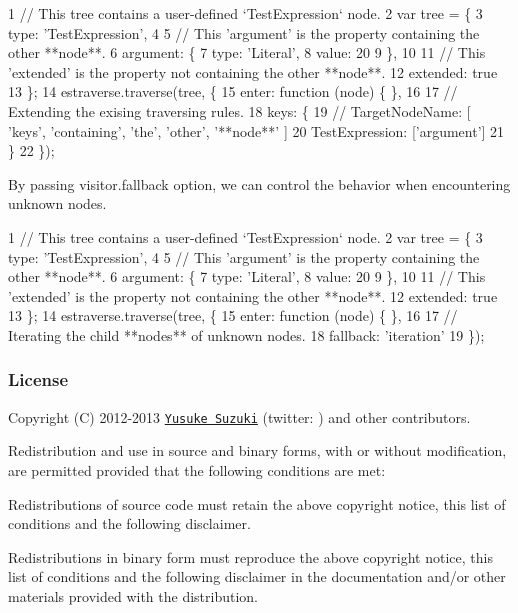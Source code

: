 \begin{DoxyCode}
1 // This tree contains a user-defined `TestExpression` node.
2 var tree = \{
3     type: 'TestExpression',
4 
5     // This 'argument' is the property containing the other **node**.
6     argument: \{
7         type: 'Literal',
8         value: 20
9     \},
10 
11     // This 'extended' is the property not containing the other **node**.
12     extended: true
13 \};
14 estraverse.traverse(tree, \{
15     enter: function (node) \{ \},
16 
17     // Extending the exising traversing rules.
18     keys: \{
19         // TargetNodeName: [ 'keys', 'containing', 'the', 'other', '**node**' ]
20         TestExpression: ['argument']
21     \}
22 \});
\end{DoxyCode}


By passing {\ttfamily visitor.\+fallback} option, we can control the behavior when encountering unknown nodes. 
\begin{DoxyCode}
1 // This tree contains a user-defined `TestExpression` node.
2 var tree = \{
3     type: 'TestExpression',
4 
5     // This 'argument' is the property containing the other **node**.
6     argument: \{
7         type: 'Literal',
8         value: 20
9     \},
10 
11     // This 'extended' is the property not containing the other **node**.
12     extended: true
13 \};
14 estraverse.traverse(tree, \{
15     enter: function (node) \{ \},
16 
17     // Iterating the child **nodes** of unknown nodes.
18     fallback: 'iteration'
19 \});
\end{DoxyCode}


\subsubsection*{License}

Copyright (C) 2012-\/2013 \href{http://github.com/Constellation}{\tt Yusuke Suzuki} (twitter\+: \href{http://twitter.com/Constellation}{\tt }) and other contributors.

Redistribution and use in source and binary forms, with or without modification, are permitted provided that the following conditions are met\+:


\begin{DoxyItemize}
\item Redistributions of source code must retain the above copyright notice, this list of conditions and the following disclaimer.
\item Redistributions in binary form must reproduce the above copyright notice, this list of conditions and the following disclaimer in the documentation and/or other materials provided with the distribution.
\end{DoxyItemize}

